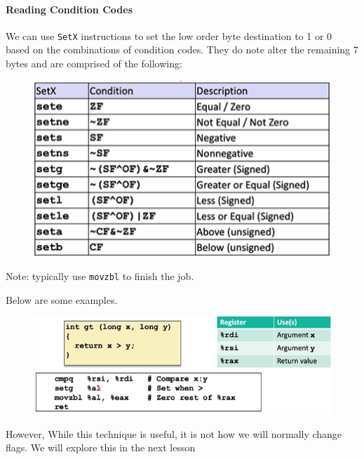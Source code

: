 \documentclass[12pt]{book}
\begin{document}
 \paragraph{Reading Condition Codes}
 We can use \texttt{SetX} instructions to set the low order byte destination to 1 or 0 based on the combinations of condition codes.
 They do note alter the remaining 7 bytes and are comprised of the following:
 \begin{figure}[h]
         \centering
         \includegraphics{./figures/setx}
 \end{figure}

 Note: typically use \texttt{movzbl} to finish the job.

 Below are some examples.
\pagebreak

\begin{figure}
        \centering
        \includegraphics{./figures/readFlagEx}
\end{figure}

However, While this technique is useful, it is not how we will normally change flags. We will explore this in the next lesson
\end{document}
